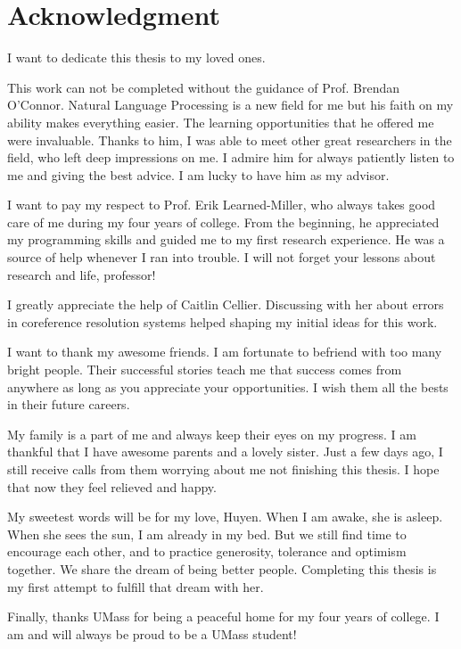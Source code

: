 \chapter{Acknowledgment}

I want to dedicate this thesis to my loved ones. 

This work can not be completed without the guidance of Prof. Brendan O'Connor. Natural Language Processing is a new field for me but his faith on my ability makes everything easier. The learning opportunities that he offered me were invaluable. Thanks to him, I was able to meet other great researchers in the field, who left deep impressions on me. I admire him for always patiently listen to me and giving the best advice. I am lucky to have him as my advisor. 

I want to pay my respect to Prof. Erik Learned-Miller, who always takes good care of me during my four years of college. From the beginning, he appreciated my programming skills and guided me to my first research experience. He was a source of help whenever I ran into trouble. I will not forget your lessons about research and life, professor!

I greatly appreciate the help of Caitlin Cellier. Discussing with her about errors in coreference resolution systems helped shaping my initial ideas for this work. 

I want to thank my awesome friends. I am fortunate to befriend with too many bright people. Their successful stories teach me that success comes from anywhere as long as you appreciate your opportunities. I wish them all the bests in their future careers.

My family is a part of me and always keep their eyes on my progress. I am thankful that I have awesome parents and a lovely sister. Just a few days ago, I still receive calls from them worrying about me not finishing this thesis. I hope that now they feel relieved and happy. 

My sweetest words will be for my love, Huyen. When I am awake, she is asleep. When she sees the sun, I am already in my bed. But we still find time to encourage each other, and to practice generosity, tolerance and optimism together. We share the dream of being better people. Completing this thesis is my first attempt to fulfill that dream with her.     

Finally, thanks UMass for being a peaceful home for my four years of college. I am and will always be proud to be a UMass student! 






